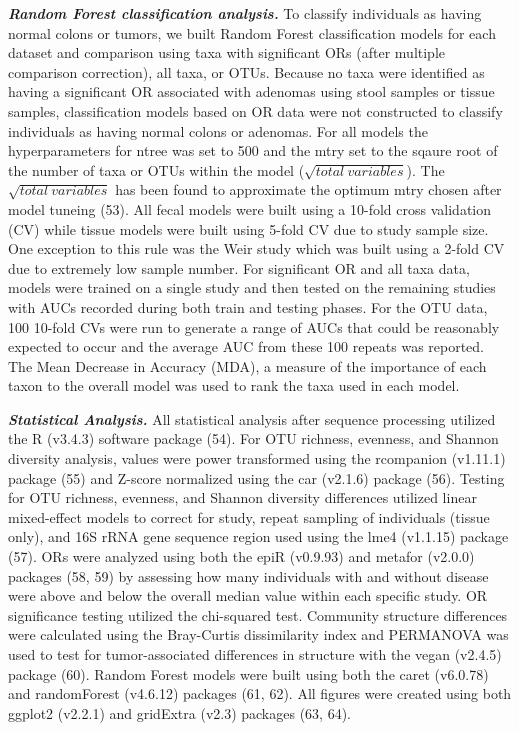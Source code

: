 \documentclass[12pt,]{article}
\begin{document}
\textbf{\emph{Random Forest classification analysis.}} To classify
individuals as having normal colons or tumors, we built Random Forest
classification models for each dataset and comparison using taxa with
significant ORs (after multiple comparison correction), all taxa, or
OTUs. Because no taxa were identified as having a significant OR
associated with adenomas using stool samples or tissue samples,
classification models based on OR data were not constructed to classify
individuals as having normal colons or adenomas. For all models the
hyperparameters for ntree was set to 500 and the mtry set to the sqaure
root of the number of taxa or OTUs within the model
(\(\sqrt{total~variables}\)). The \(\sqrt{total~variables}\) has been
found to approximate the optimum mtry chosen after model tuneing (53).
All fecal models were built using a 10-fold cross validation (CV) while
tissue models were built using 5-fold CV due to study sample size. One
exception to this rule was the Weir study which was built using a 2-fold
CV due to extremely low sample number. For significant OR and all taxa
data, models were trained on a single study and then tested on the
remaining studies with AUCs recorded during both train and testing
phases. For the OTU data, 100 10-fold CVs were run to generate a range
of AUCs that could be reasonably expected to occur and the average AUC
from these 100 repeats was reported. The Mean Decrease in Accuracy
(MDA), a measure of the importance of each taxon to the overall model
was used to rank the taxa used in each model.

\textbf{\emph{Statistical Analysis.}} All statistical analysis after
sequence processing utilized the R (v3.4.3) software package (54). For
OTU richness, evenness, and Shannon diversity analysis, values were
power transformed using the rcompanion (v1.11.1) package (55) and
Z-score normalized using the car (v2.1.6) package (56). Testing for OTU
richness, evenness, and Shannon diversity differences utilized linear
mixed-effect models to correct for study, repeat sampling of individuals
(tissue only), and 16S rRNA gene sequence region used using the lme4
(v1.1.15) package (57). ORs were analyzed using both the epiR (v0.9.93)
and metafor (v2.0.0) packages (58, 59) by assessing how many individuals
with and without disease were above and below the overall median value
within each specific study. OR significance testing utilized the
chi-squared test. Community structure differences were calculated using
the Bray-Curtis dissimilarity index and PERMANOVA was used to test for
tumor-associated differences in structure with the vegan (v2.4.5)
package (60). Random Forest models were built using both the caret
(v6.0.78) and randomForest (v4.6.12) packages (61, 62). All figures were
created using both ggplot2 (v2.2.1) and gridExtra (v2.3) packages (63,
64).
\end{document}
